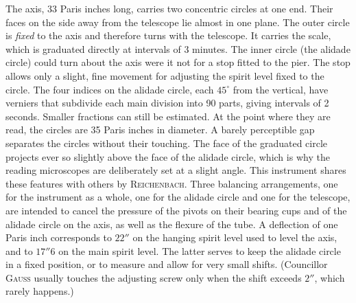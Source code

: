 The axis, 33 Paris inches long, carries two concentric circles at one end. Their faces on the side away from the telescope lie almost in one plane. The outer circle is \textit{fixed} to the axis and therefore turns with the telescope. It carries the scale, which is graduated directly at intervals of 3 
minutes. The inner circle (the alidade circle) could turn about the axis were it not for a stop fitted to the pier. The stop allows only a slight, fine movement for adjusting the spirit level fixed to the circle. The four indices on the alidade circle, each $45^\circ$ from the vertical, have verniers that subdivide each main division into 90 parts, giving intervals of 2 seconds. Smaller fractions can still be estimated. At the point where they are read, the circles are 35 Paris inches in diameter. A barely perceptible gap separates the circles without their touching. The face of the graduated circle projects ever so slightly above the face of the alidade circle, which is why the reading microscopes are deliberately set at a slight angle. This instrument shares these features with others by \textsc{Reichenbach}. Three balancing arrangements, one for the instrument as a whole, one for the alidade circle and one for the telescope, are intended to cancel the pressure of the pivots on their bearing cups and of the alidade circle on the axis, as well as the flexure of the tube. A deflection of one Paris inch corresponds to $22''$ on the hanging spirit level used to level the axis, and to $17''6$ on the main spirit level. The latter serves to keep the alidade circle in a fixed position, or to measure and allow for very small shifts. (Councillor \textsc{Gauss} usually touches the adjusting screw only when the shift exceeds $2''$, which rarely happens.)

